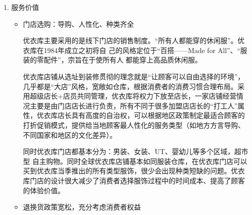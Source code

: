 \documentclass{xjtureport}
\begin{document}
\begin{enumerate}
\begin{enumerate}
\begin{itemize}
        \begin{figure}[H]
            \centering
        \end{figure}
    \end{itemize}
    \item 服务价值
    \begin{itemize}
        \item 门店选购：导购、人性化、种类齐全
        
    优衣库主要采用的是线下门店的销售制度。“所有人都能穿的休闲服”。优衣库在1984年成立之初将自
己的风格定位于“百搭——Made for All”、“服装的零配件”，宗旨在于使所有人
都能穿上高品质休闲服。

优衣库店铺从选址到装修贯彻的理念就是“让顾客可以自由选择的环境”，
几乎都是“大店”风格，宽敞如仓库，根据消费者的消费习惯合理布局。采用超级店长+店员共同管理，优衣库将权力下放至店长，一家店铺经营情况主要是由门店店长进行负责，所有不同于很多加盟店店长的“打工人”属性，优衣库店长具有高度的自治权，可以根据地区政策制定最适合顾客的打折促销模式，提供给当地顾客最人性化的服务类型（如地方方言导购、不同国家和地区的文化差异）。

同时优衣库门店都基本分为：男装、女装、UT、婴幼儿等多个区域，超市型
自主购物。同时全球优衣库店铺基本如同服装仓库，在优衣库门店可以买到优衣库当季推出的所有类型服饰，很少会出现种类短缺的问题。优衣库门店的设计很大减少了消费者选择服饰过程中的时间成本、提高了顾客的体验价值。
        \item 退换货政策宽松，充分考虑消费者权益
        

\end{itemize}
\end{enumerate}
\end{enumerate}
\end{document}
